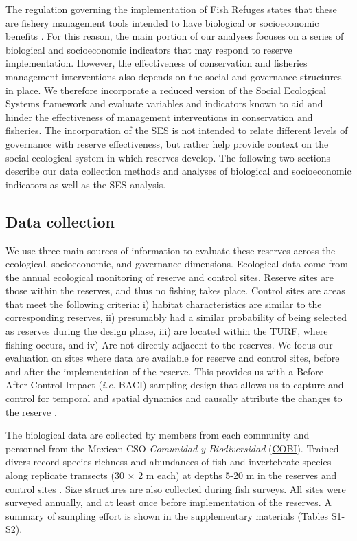 \documentclass{frontiersSCNS}
\begin{document}
The regulation governing the implementation of Fish Refuges states that
these are fishery management tools intended to have biological or
socioeconomic benefits \citep{nom}. For this reason, the main portion of
our analyses focuses on a series of biological and socioeconomic
indicators that may respond to reserve implementation. However, the
effectiveness of conservation and fisheries management interventions
also depends on the social and governance structures in place. We
therefore incorporate a reduced version of the Social Ecological Systems
framework \citep{ostrom_2009} and evaluate variables and indicators
known to aid and hinder the effectiveness of management interventions in
conservation and fisheries. The incorporation of the SES is not intended
to relate different levels of governance with reserve effectiveness, but
rather help provide context on the social-ecological system in which
reserves develop. The following two sections describe our data
collection methods and analyses of biological and socioeconomic
indicators as well as the SES analysis.

\hypertarget{data-collection}{%
\subsection{Data collection}\label{data-collection}}

We use three main sources of information to evaluate these reserves
across the ecological, socioeconomic, and governance dimensions.
Ecological data come from the annual ecological monitoring of reserve
and control sites. Reserve sites are those within the reserves, and thus
no fishing takes place. Control sites are areas that meet the following
criteria: i) habitat characteristics are similar to the corresponding
reserves, ii) presumably had a similar probability of being selected as
reserves during the design phase, iii) are located within the TURF,
where fishing occurs, and iv) Are not directly adjacent to the reserves.
We focus our evaluation on sites where data are available for reserve
and control sites, before and after the implementation of the reserve.
This provides us with a Before-After-Control-Impact (\emph{i.e.} BACI)
sampling design that allows us to capture and control for temporal and
spatial dynamics \citep{stewartoaten_1986,depalma_2018} and causally
attribute the changes to the reserve
\citep{francinifilho_2008,moland_2013,Villasenor-Derbez_2018}.

The biological data are collected by members from each community and
personnel from the Mexican CSO \emph{Comunidad y Biodiversidad}
(\href{www.cobi.org.mx}{COBI}). Trained divers record species richness
and abundances of fish and invertebrate species along replicate
transects (30 \(\times\) 2 m each) at depths 5-20 m in the reserves and
control sites \citep{suman_2010-ez,fulton_2018,fulton_2019}. Size
structures are also collected during fish surveys. All sites were
surveyed annually, and at least once before implementation of the
reserves. A summary of sampling effort is shown in the supplementary
materials (Tables S1-S2).
\end{document}
